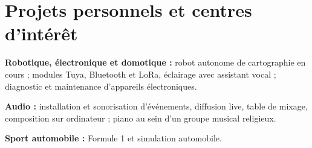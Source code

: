 \documentclass[10pt,a4paper]{article}
\begin{document}
\vspace{0.6cm}

\section{Projets personnels et centres d'intérêt}
\vspace{0.2cm}

\textbf{Robotique, électronique et domotique :}
robot autonome de cartographie en cours ; modules Tuya,
Bluetooth et LoRa, éclairage avec assistant vocal ;
diagnostic et maintenance d'appareils électroniques.\par

\textbf{Audio :}
installation et sonorisation d'événements, diffusion live,
table de mixage, composition sur ordinateur ;
piano au sein d'un groupe musical religieux.\par

\textbf{Sport automobile :}
Formule 1 et simulation automobile.
\end{document}
